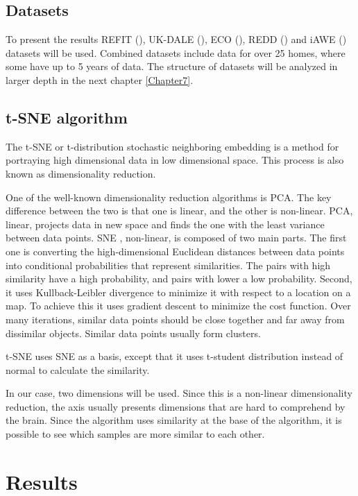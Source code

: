 \subsection{Datasets}

To present the results REFIT (\cite{REFIT}), UK-DALE  (\cite{UKDALE}), ECO  (\cite{ECO}), REDD  (\cite{REDD}) and iAWE  (\cite{iAWE}) datasets will be used.
Combined datasets include data for over 25 homes, where some have up to 5 years of data. 
The structure of datasets will be analyzed in larger depth in the next chapter \ref{Chapter7}. 

\subsection{t-SNE algorithm}

The t-SNE \cite{tsne2} or t-distribution stochastic neighboring embedding is a method for portraying high dimensional 
data in low dimensional space. This process is also known as dimensionality reduction.

One of the well-known dimensionality reduction algorithms is PCA.
The key difference between the two is that one is linear, and the other is non-linear.
PCA, linear, projects data in new space and finds the one with the least variance between data points.
SNE \cite{sne1}, non-linear, is composed of two main parts. The first one is 
converting the high-dimensional Euclidean distances between data points into conditional probabilities that represent similarities. %
The pairs with high similarity have a high probability, and pairs with lower a low probability.
Second, it uses Kullback-Leibler divergence to minimize it with respect to a location on a map.
To achieve this it uses gradient descent to minimize the cost function.
Over many iterations, similar data points should be close together and far away from dissimilar objects.
Similar data points usually form clusters.

t-SNE uses SNE as a basis, except that it uses t-student distribution instead of normal to calculate the similarity.

In our case, two dimensions will be used. Since this is a non-linear dimensionality reduction,
the axis usually presents dimensions that are hard to comprehend by the brain. 
Since the algorithm uses similarity at the base of the algorithm, it is possible to 
see which samples are more similar to each other.


\section{Results}

